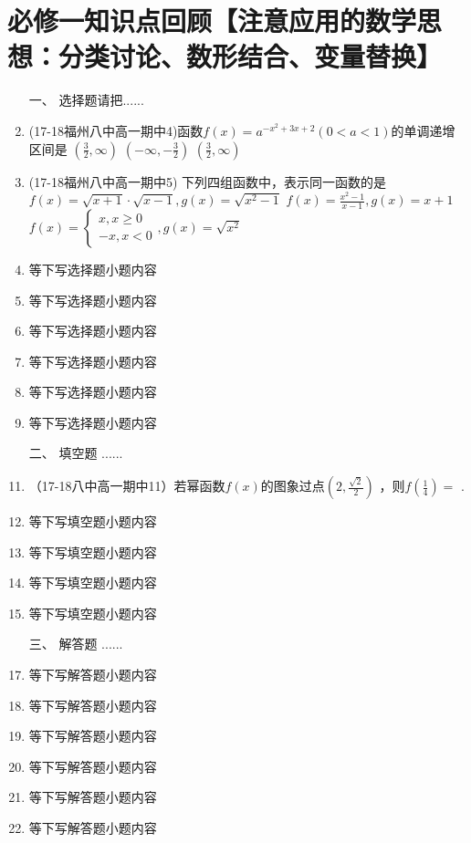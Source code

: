 \section{必修一知识点回顾【注意应用的数学思想：分类讨论、数形结合、变量替换】}
\begin{enumerate} 
        \item[一、] 选择题请把......
        \item (17-18福州八中高一期中4)函数$f(x)=a^{-x^2+3x+2}(0<a<1)$的单调递增区间是\xz
        {$(\frac32,\infty)$}
        {$(-\infty,-\frac32)$}
        {$(\frac32,\infty)$}

        \item  (17-18福州八中高一期中5) 下列四组函数中，表示同一函数的是\xz
        {$f(x)=\sqrt{x+1}\cdot\sqrt{x-1},g(x)=\sqrt{x^2-1}$}
        {$f(x)=\frac{x^2-1}{x-1},g(x)=x+1$}
        {$f(x)=\begin{cases}x,x\geq0\\-x,x<0\end{cases},g(x)=\sqrt{x^2}$}
        \item 等下写选择题小题内容 
        \item 等下写选择题小题内容 
        \item 等下写选择题小题内容 
        \item 等下写选择题小题内容 
        \item 等下写选择题小题内容 
        \item 等下写选择题小题内容 

        \item[二、] 填空题  ......
        \item （17-18八中高一期中11）若幂函数$f(x)$的图象过点$(2,\frac{\sqrt2}2)$ ，则$f(\frac14 )= $ \tk.
        \item 等下写填空题小题内容 
        \item 等下写填空题小题内容 
        \item 等下写填空题小题内容 
        \item 等下写填空题小题内容 

        \item[三、] 解答题  ......
        \item 等下写解答题小题内容 
        \item 等下写解答题小题内容 
        \item 等下写解答题小题内容 
        \item 等下写解答题小题内容 
        \item 等下写解答题小题内容 
        \item 等下写解答题小题内容 
\end{enumerate} 
